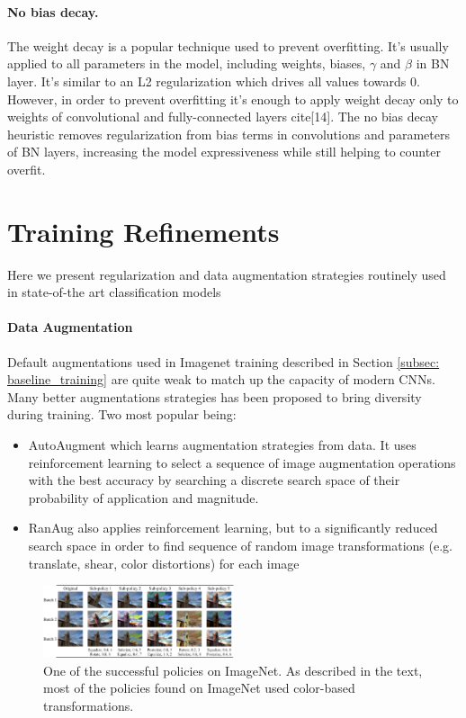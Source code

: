 \paragraph{No bias decay.}
The weight decay is a popular technique used to prevent overfitting. It's usually applied to all parameters in the model, including weights, biases, $\gamma$ and $\beta$ in BN layer. It's similar to an L2 regularization which drives all values towards $0$. However, in order to prevent overfitting it's enough to apply weight decay only to weights of convolutional and fully-connected layers cite[14]. The no bias decay heuristic removes regularization from bias terms in convolutions and parameters of BN layers, increasing the model expressiveness while still helping to counter overfit.  


\section{Training Refinements}

Here we present regularization and data augmentation strategies routinely used in state-of-the art classification models \cite{lin2020neural_genet} \cite{tan2019_efficientnet} \cite{tan2021_efficientnetv2}

\paragraph{Data Augmentation}
Default augmentations used in Imagenet training described in Section \ref{subsec: baseline_training} are quite weak to match up the capacity of modern CNNs. Many better augmentations strategies has been proposed to bring diversity during training. Two most popular being: 

\begin{itemize}
    \item AutoAugment \cite{cubuk2018_autoaugment} which learns augmentation strategies from data. It uses reinforcement learning to select a sequence of image augmentation operations with the best accuracy by searching a discrete search space of their probability of application and magnitude.
    \item RanAug \cite{cubuk2020_randaugment} also applies reinforcement learning, but to a significantly reduced search space in order to find sequence of random image transformations (e.g. translate, shear, color distortions) for each image
\end{itemize}

\begin{figure}[h!]
    \caption{One of the successful policies on ImageNet. As described in the text, most of the policies found on ImageNet used color-based transformations.}
    \label{fig: randaug}
    \includegraphics[width=0.5\textwidth]{images/randaug_policy.png}
  \end{figure}

